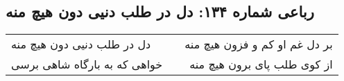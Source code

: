 \begin{center}
\section*{رباعی شماره ۱۳۴: دل در طلب دنیی دون هیچ منه}
\label{sec:134}
\begin{longtable}{l p{0.5cm} r}
دل در طلب دنیی دون هیچ منه
&&
بر دل غم او کم و فزون هیچ منه
\\
خواهی که به بارگاه شاهی برسی
&&
از کوی طلب پای برون هیچ منه
\\
\end{longtable}
\end{center}
